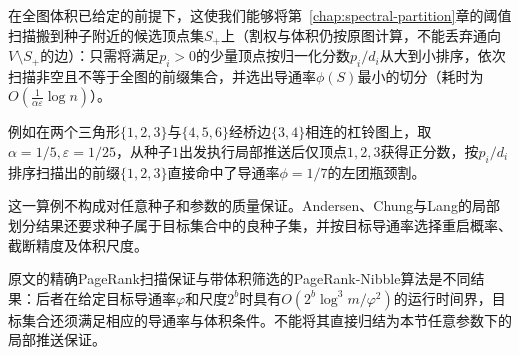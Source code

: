 在全图体积已给定的前提下，这使我们能够将第~\ref{chap:spectral-partition}章的阈值扫描搬到种子附近的候选顶点集$S_+$上（割权与体积仍按原图计算，不能丢弃通向$V\setminus S_+$的边）：只需将满足$p_i>0$的少量顶点按归一化分数$p_i/d_i$从大到小排序，依次扫描非空且不等于全图的前缀集合，并选出导通率$\phi(S)$最小的切分（耗时为$O(\frac{1}{\alpha\varepsilon}\log n)$）。

例如在两个三角形$\{1,2,3\}$与$\{4,5,6\}$经桥边$\{3,4\}$相连的杠铃图上，取$\alpha=1/5,\varepsilon=1/25$，从种子$1$出发执行局部推送后仅顶点$1,2,3$获得正分数，按$p_i/d_i$排序扫描出的前缀$\{1,2,3\}$直接命中了导通率$\phi=1/7$的左团瓶颈割。

这一算例不构成对任意种子和参数的质量保证。Andersen、Chung与Lang的局部划分结果还要求种子属于目标集合中的良种子集，并按目标导通率选择重启概率、截断精度及体积尺度。

原文的精确PageRank扫描保证与带体积筛选的PageRank-Nibble算法是不同结果：后者在给定目标导通率$\varphi$和尺度$2^b$时具有$O(2^b\log^3 m/\varphi^2)$的运行时间界，目标集合还须满足相应的导通率与体积条件。不能将其直接归结为本节任意参数下的局部推送保证。
